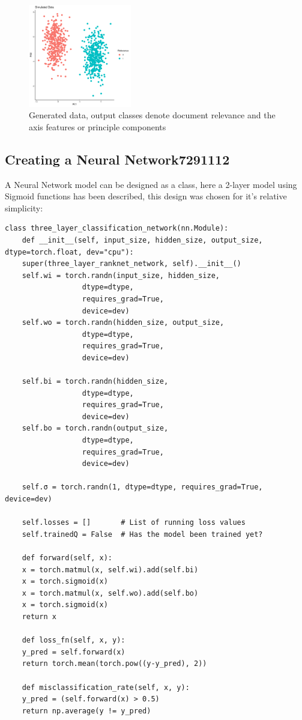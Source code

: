 \documentclass[a4paper,11pt,twoside]{article}
\begin{document}
\begin{figure}[htbp]
\centering
\includegraphics[width=0.4\textwidth]{SimulatedData.png}
\caption{\label{fig:orga2c4a64}Generated data, output classes denote document relevance and the axis features or principle components}
\end{figure}

\subsection{Creating a Neural Network\hfill{}\textsc{7291112}}
\label{sec:org4fa7e5f}
A Neural Network model can be designed as a class, here a 2-layer
model using Sigmoid functions has been described, this design was
chosen for it's relative simplicity:

\begin{verbatim}
class three_layer_classification_network(nn.Module):
    def __init__(self, input_size, hidden_size, output_size, dtype=torch.float, dev="cpu"):
	super(three_layer_ranknet_network, self).__init__()
	self.wi = torch.randn(input_size, hidden_size,
			      dtype=dtype,
			      requires_grad=True,
			      device=dev)
	self.wo = torch.randn(hidden_size, output_size,
			      dtype=dtype,
			      requires_grad=True,
			      device=dev)

	self.bi = torch.randn(hidden_size,
			      dtype=dtype,
			      requires_grad=True,
			      device=dev)
	self.bo = torch.randn(output_size,
			      dtype=dtype,
			      requires_grad=True,
			      device=dev)

	self.σ = torch.randn(1, dtype=dtype, requires_grad=True, device=dev)

	self.losses = []       # List of running loss values
	self.trainedQ = False  # Has the model been trained yet?

    def forward(self, x):
	x = torch.matmul(x, self.wi).add(self.bi)
	x = torch.sigmoid(x)
	x = torch.matmul(x, self.wo).add(self.bo)
	x = torch.sigmoid(x)
	return x

    def loss_fn(self, x, y):
	y_pred = self.forward(x)
	return torch.mean(torch.pow((y-y_pred), 2))

    def misclassification_rate(self, x, y):
	y_pred = (self.forward(x) > 0.5)
	return np.average(y != y_pred)
\end{verbatim}
\end{document}
